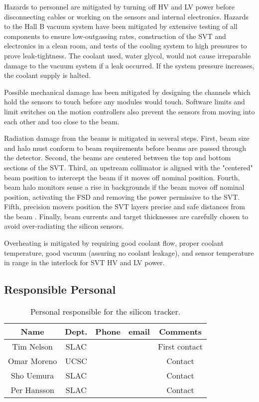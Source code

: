 Hazards to personnel are mitigated by turning off HV and LV power before disconnecting cables or working on the sensors and internal electronics.
Hazards to the Hall B vacuum system have been mitigated by extensive testing of all components to ensure low-outgassing rates, construction of the SVT and electronics in a clean room, and tests of the cooling system to high pressures to prove leak-tightness. The coolant used, water glycol, would not cause irreparable damage to the vacuum system if a leak occurred. If the system pressure  increases, the coolant supply is halted.

Possible mechanical damage has been mitigated by designing the channels which hold the sensors to touch before any modules would touch. Software limits and  limit switches on the motion controllers also prevent the sensors from moving into each other and too close to the beam.

Radiation damage from the beams is mitigated in several steps. First, beam size and halo must conform to beam requirements before beams are passed through the detector. Second, the beams are centered between the top and bottom sections of the SVT. Third, an upstream collimator is aligned with the "centered" beam position to intercept the beam if it moves off nominal position. Fourth, beam halo monitors sense a rise in backgrounds if the beam moves off nominal position, activating the FSD and removing the power permissive to the SVT. Fifth, precision movers position the SVT layers precise and safe distances from the beam . Finally, beam currents and target thicknesses are carefully chosen to avoid over-radiating the silicon sensors.

Overheating is mitigated by requiring good coolant flow, proper coolant temperature, good vacuum (assuring no coolant leakage), and sensor temperature in range  in the interlock for SVT HV and LV power. 

\subsection{Responsible Personal}

 \begin{table}[!htb]
 \centering
 \begin{tabular}{|c|c|c|c|c|}
\hline
 Name&Dept.&Phone&email&Comments \\ \hline
Tim Nelson& SLAC&&& First contact \\ \hline
Omar Moreno & UCSC & && Contact \\ \hline
Sho Uemura&SLAC& && Contact \\ \hline
Per Hansson&SLAC& && Contact \\ \hline
 \end{tabular}
\caption{ Personal responsible for the silicon tracker.} 
\label{tb:beam}
\end{table}


